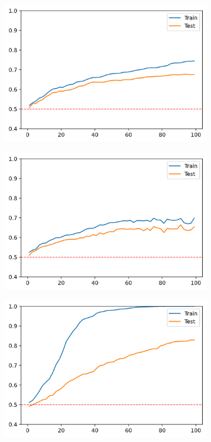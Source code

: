 \begin{figure}[H]
    \centering
    \begin{subfigure}[b]{0.32\linewidth}
        \includegraphics[width=\linewidth]{img/random_liblinarl.png}
    \end{subfigure}
    \begin{subfigure}[b]{0.32\linewidth}
        \includegraphics[width=\linewidth]{img/random_linar.png}
    \end{subfigure}
    \begin{subfigure}[b]{0.32\linewidth}
        \includegraphics[width=\linewidth]{img/random_precomputed.png}

\end{subfigure}
\end{figure}
